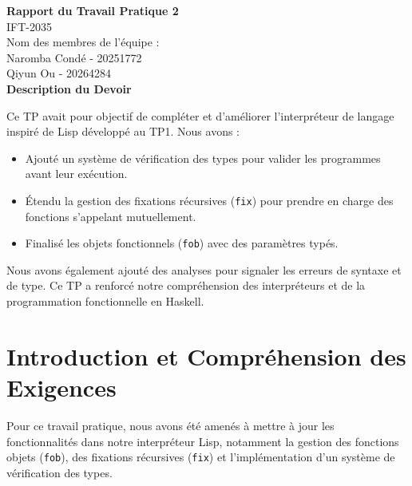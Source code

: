\documentclass[a4paper,12pt]{article}
\begin{document}
\begin{titlepage}
    \centering
    \vspace*{1cm}
    {\huge \textbf{Rapport du Travail Pratique 2}}\\
    \vspace{0.5cm}
    {\large IFT-2035}\\
    \vspace{1.5cm}
    {\large Nom des membres de l'équipe :}\\
    \vspace{0.5cm}
    {\large Naromba Condé    -    20251772}\\
    {\large Qiyun Ou         -    20264284}\\

    \vspace{2cm}
    {\Large \textbf{Description du Devoir}}\\
    \vspace{0.5cm}
    {\large
    Ce TP avait pour objectif de compléter et d'améliorer l'interpréteur de langage inspiré de Lisp développé au TP1. Nous avons :
    \begin{itemize}
        \item Ajouté un système de vérification des types pour valider les programmes avant leur exécution.
        \item Étendu la gestion des fixations récursives (\texttt{fix}) pour prendre en charge des fonctions s'appelant mutuellement.
        \item Finalisé les objets fonctionnels (\texttt{fob}) avec des paramètres typés.
    \end{itemize}

    Nous avons également ajouté des analyses pour signaler les erreurs de syntaxe et de type. Ce TP a renforcé notre compréhension des interpréteurs et de la programmation fonctionnelle en Haskell.
    }
    \vfill
\end{titlepage}

\section{Introduction et Compréhension des Exigences}

Pour ce travail pratique, nous avons été amenés à mettre à jour les fonctionnalités dans notre interpréteur Lisp, notamment la gestion des fonctions objets (\texttt{fob}), des fixations récursives (\texttt{fix}) et l'implémentation d'un système de vérification des types.
\end{document}
